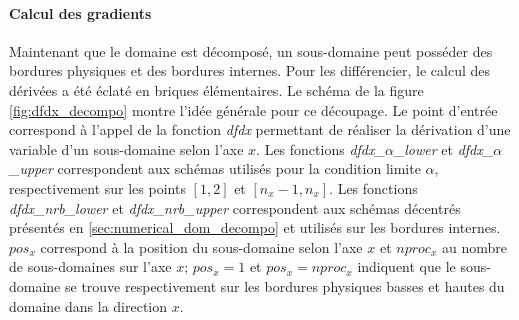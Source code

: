 \paragraph{Calcul des gradients}
Maintenant que le domaine est décomposé, un sous-domaine peut posséder des bordures physiques et des bordures internes. Pour les différencier, le calcul des dérivées a été éclaté en briques élémentaires. Le schéma de la figure \ref{fig:dfdx_decompo} montre l'idée générale pour ce découpage. Le point d'entrée correspond à l'appel de la fonction \textit{dfdx} permettant de réaliser la dérivation d'une variable d'un sous-domaine selon l'axe $x$. Les fonctions \textit{dfdx\_$\alpha$\_lower} et \textit{dfdx\_$\alpha$\_upper} correspondent aux schémas utilisés pour la condition limite $\alpha$, respectivement sur les points $[1,2]$ et $[n_x-1,n_x]$. Les fonctions \textit{dfdx\_nrb\_lower} et \textit{dfdx\_nrb\_upper} correspondent aux schémas décentrés présentés en \ref{sec:numerical_dom_decompo} et utilisés sur les bordures internes. $pos_x$ correspond à la position du sous-domaine selon l'axe $x$ et $nproc_x$ au nombre de sous-domaines sur l'axe $x$; $pos_x=1$ et $pos_x=nproc_x$ indiquent que le sous-domaine se trouve respectivement sur les bordures physiques basses et hautes du domaine dans la direction $x$.



